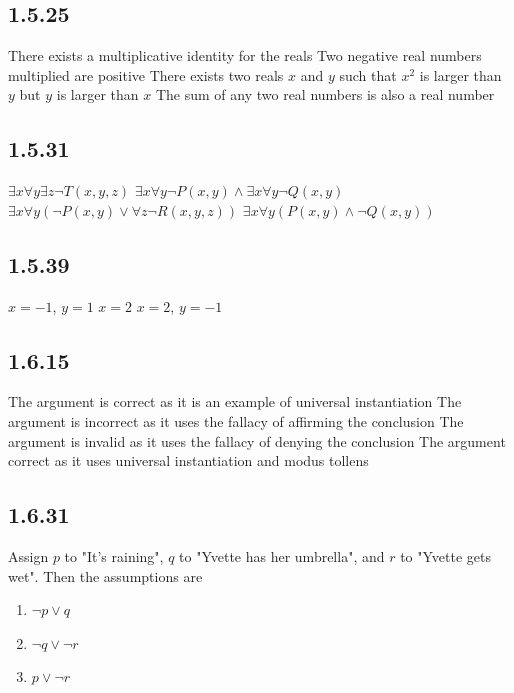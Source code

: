 \documentclass[12pt,titlepage]{extarticle}
\begin{document}
\subsection*{1.5.25}
\begin{tasks}
    \task There exists a multiplicative identity for the reals
    \task Two negative real numbers multiplied are positive
    \task There exists two reals $x$ and $y$ such that $x^2$ is larger than $y$ but $y$ is larger than $x$
    \task The sum of any two real numbers is also a real number
\end{tasks}

\subsection*{1.5.31}
\begin{tasks}
    \task $\exists x \forall y \exists z \lnot T(x,y,z)$
    \task $\exists x \forall y \lnot P(x,y) \land \exists x \forall y \lnot Q(x,y)$
    \task $\exists x \forall y (\lnot P(x,y) \lor \forall z \lnot R(x,y,z))$
    \task $\exists x \forall y (P(x,y) \land \lnot Q(x,y))$
\end{tasks}

\subsection*{1.5.39}
\begin{tasks}
    \task $x = -1$, $y = 1$
    \task $x = 2$
    \task $x = 2$, $y = -1$
\end{tasks}

\subsection*{1.6.15}
\begin{tasks}
    \task The argument is correct as it is an example of universal instantiation
    \task The argument is incorrect as it uses the fallacy of affirming the conclusion
    \task The argument is invalid as it uses the fallacy of denying the conclusion
    \task The argument correct as it uses universal instantiation and modus tollens
\end{tasks}

\subsection*{1.6.31}
Assign $p$ to "It's raining", $q$ to "Yvette has her umbrella", and $r$ to "Yvette gets wet". Then the assumptions are
\begin{enumerate}
    \item $\lnot p \lor q$
    \item $\lnot q \lor \lnot r$
    \item $p \lor \lnot r$
\end{enumerate}
\end{document}
